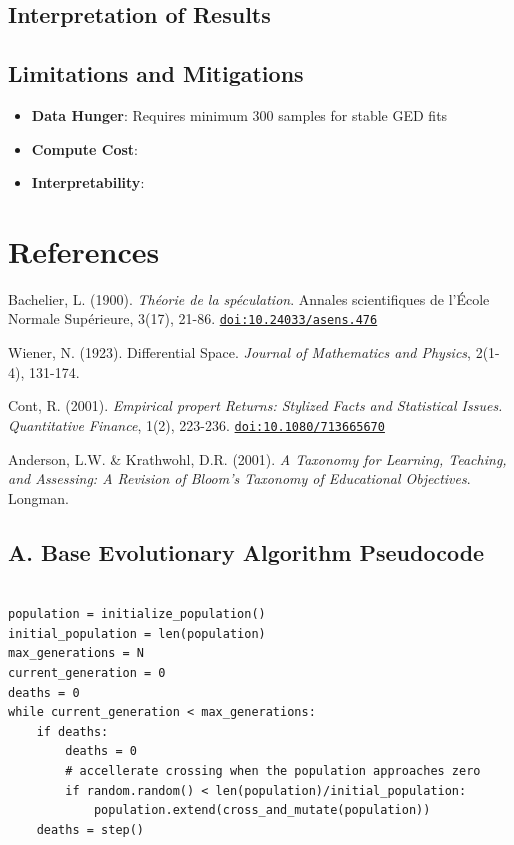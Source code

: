 \documentclass[12pt]{article}
\begin{document}
\subsection{Interpretation of Results}
\subsection{Limitations and Mitigations}
\begin{itemize}
\item \textbf{Data Hunger}: Requires minimum 300 samples for stable GED fits
\item \textbf{Compute Cost}:
\item \textbf{Interpretability}:
\end{itemize}

\section*{References}
\label{sec:references}

\begin{thebibliography}{9}

Bachelier, L. (1900). \textit{Théorie de la spéculation}. Annales scientifiques de l'École Normale Supérieure, 3(17), 21-86.
\href{https://doi.org/10.24033/asens.476}{\texttt{doi:10.24033/asens.476}}

Wiener, N. (1923). Differential Space. \textit{Journal of Mathematics and Physics}, 2(1-4), 131-174.

Cont, R. (2001). \textit{Empirical propert Returns: Stylized Facts and Statistical Issues. Quantitative Finance}, 1(2), 223-236.
\href{https://doi.org/10.1080/713665670}{\texttt{doi:10.1080/713665670}}

Anderson, L.W. \& Krathwohl, D.R. (2001). \textit{A Taxonomy for Learning, Teaching, and Assessing: A Revision of Bloom's Taxonomy of Educational Objectives}. Longman.

\end{thebibliography}

\subsection*{A. Base Evolutionary Algorithm Pseudocode}
\begin{lstlisting}

population = initialize_population()
initial_population = len(population)
max_generations = N
current_generation = 0
deaths = 0
while current_generation < max_generations:
    if deaths:
        deaths = 0
        # accellerate crossing when the population approaches zero
        if random.random() < len(population)/initial_population:
            population.extend(cross_and_mutate(population))
    deaths = step()

\end{lstlisting}
\end{document}
